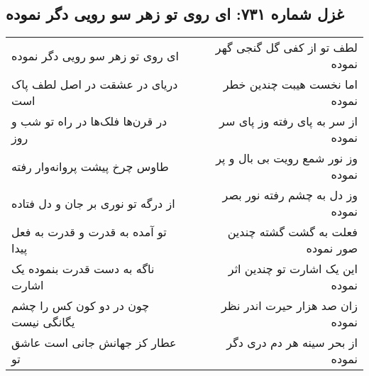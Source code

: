 \begin{center}
\section*{غزل شماره ۷۳۱: ای روی تو زهر سو رویی دگر نموده}
\label{sec:731}
\begin{longtable}{l p{0.5cm} r}
ای روی تو زهر سو رویی دگر نموده
&&
لطف تو از کفی گل گنجی گهر نموده
\\
دریای در عشقت در اصل لطف پاک است
&&
اما نخست هیبت چندین خطر نموده
\\
در قرن‌ها فلک‌ها در راه تو شب و روز
&&
از سر به پای رفته وز پای سر نموده
\\
طاوس چرخ پیشت پروانه‌وار رفته
&&
وز نور شمع رویت بی بال و پر نموده
\\
از درگه تو نوری بر جان و دل فتاده
&&
وز دل به چشم رفته نور بصر نموده
\\
تو آمده به قدرت و قدرت به فعل پیدا
&&
فعلت به گشت گشته چندین صور نموده
\\
ناگه به دست قدرت بنموده یک اشارت
&&
این یک اشارت تو چندین اثر نموده
\\
چون در دو کون کس را چشم یگانگی نیست
&&
زان صد هزار حیرت اندر نظر نموده
\\
عطار کز جهانش جانی است عاشق تو
&&
از بحر سینه هر دم دری دگر نموده
\\
\end{longtable}
\end{center}
